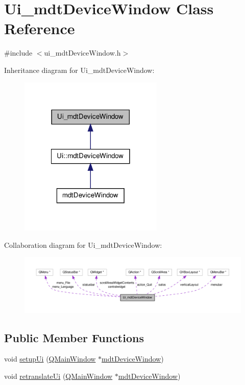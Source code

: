 \hypertarget{class_ui__mdt_device_window}{\section{Ui\-\_\-mdt\-Device\-Window Class Reference}
\label{class_ui__mdt_device_window}
}


{\ttfamily \#include $<$ui\-\_\-mdt\-Device\-Window.\-h$>$}



Inheritance diagram for Ui\-\_\-mdt\-Device\-Window\-:
\nopagebreak
\begin{figure}[H]
\begin{center}
\leavevmode
\includegraphics[width=194pt]{class_ui__mdt_device_window__inherit__graph}
\end{center}
\end{figure}


Collaboration diagram for Ui\-\_\-mdt\-Device\-Window\-:
\nopagebreak
\begin{figure}[H]
\begin{center}
\leavevmode
\includegraphics[width=350pt]{class_ui__mdt_device_window__coll__graph}
\end{center}
\end{figure}
\subsection*{Public Member Functions}
\begin{DoxyCompactItemize}
\item 
void \hyperlink{class_ui__mdt_device_window_a0cdedb1dd83eba2873d0c17c529a30ca}{setup\-Ui} (\hyperlink{class_q_main_window}{Q\-Main\-Window} $\ast$\hyperlink{classmdt_device_window}{mdt\-Device\-Window})
\item 
void \hyperlink{class_ui__mdt_device_window_af16eccf51af471614d5798135a342119}{retranslate\-Ui} (\hyperlink{class_q_main_window}{Q\-Main\-Window} $\ast$\hyperlink{classmdt_device_window}{mdt\-Device\-Window})
\end{DoxyCompactItemize}
